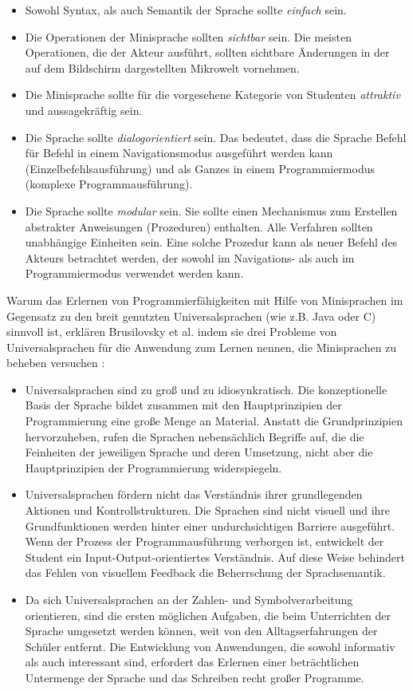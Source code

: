 \begin{itemize}
    \item Sowohl Syntax, als auch Semantik der Sprache sollte \emph{einfach} sein.
    \item Die Operationen der Minisprache sollten \emph{sichtbar} sein. Die meisten Operationen, die der Akteur ausführt, sollten sichtbare Änderungen in der auf dem Bildschirm dargestellten Mikrowelt vornehmen.
    \item Die Minisprache sollte für die vorgesehene Kategorie von Studenten \emph{attraktiv} und aussagekräftig sein.
    \item Die Sprache sollte \emph{dialogorientiert} sein. Das bedeutet, dass die Sprache Befehl für Befehl in einem Navigationsmodus ausgeführt werden kann (Einzelbefehlsausführung) und als Ganzes in einem Programmiermodus (komplexe Programmausführung).
    \item Die Sprache sollte \emph{modular} sein. Sie sollte einen Mechanismus zum Erstellen abstrakter Anweisungen (Prozeduren) enthalten. Alle Verfahren sollten unabhängige Einheiten sein. Eine solche Prozedur kann als neuer Befehl des Akteurs betrachtet werden, der sowohl im Navigations- als auch im Programmiermodus verwendet werden kann.
\end{itemize}

Warum das Erlernen von Programmierfähigkeiten mit Hilfe von Minisprachen im Gegensatz zu den breit genutzten Universalsprachen (wie z.B. Java oder C) sinnvoll ist, erklären Brusilovsky et al. indem sie drei Probleme von Universalsprachen für die Anwendung zum Lernen nennen, die Minisprachen zu beheben versuchen \cite[67]{brusilovsky1997}:

\begin{itemize}
    \item Universalsprachen sind zu groß und zu idiosynkratisch. Die konzeptionelle Basis der Sprache bildet zusammen mit den Hauptprinzipien der Programmierung eine große Menge an Material. Anstatt die Grundprinzipien hervorzuheben, rufen die Sprachen nebensächlich Begriffe auf, die die Feinheiten der jeweiligen Sprache und deren Umsetzung, nicht aber die Hauptprinzipien der Programmierung widerspiegeln.
    \item Universalsprachen fördern nicht das Verständnis ihrer grundlegenden Aktionen und Kontrollstrukturen. Die Sprachen sind nicht visuell und ihre Grundfunktionen werden hinter einer undurchsichtigen Barriere ausgeführt. Wenn der Prozess der Programmausführung verborgen ist, entwickelt der Student ein Input-Output-orientiertes Verständnis. Auf diese Weise behindert das Fehlen von visuellem Feedback die Beherrschung der Sprachsemantik.
    \item Da sich Universalsprachen an der Zahlen- und Symbolverarbeitung orientieren, sind die ersten möglichen Aufgaben, die beim Unterrichten der Sprache umgesetzt werden können, weit von den Alltagserfahrungen der Schüler entfernt. Die Entwicklung von Anwendungen, die sowohl informativ als auch interessant sind, erfordert das Erlernen einer beträchtlichen Untermenge der Sprache und das Schreiben recht großer Programme.
\end{itemize}

